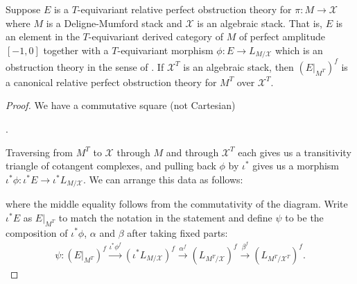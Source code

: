 \begin{lemma}\label{rl-000G}\label{lem:obstruction-theory-for-the-fixed-locus}
  Suppose \(E\) is a \(T\)-equivariant relative perfect obstruction theory for \(\pi:M\to \mathcal X\) where \(M\) is a Deligne-Mumford stack and \(\mathcal X\) is an algebraic stack. That is, \(E\) is an element in the \(T\)-equivariant derived category of \(M\) of perfect amplitude \([-1,0]\) together with a \(T\)-equivariant morphism \(\phi: E\to L_{M/\mathcal X}\) which is an obstruction theory in the sense of \cite[Definition 4.4]{behrend-fantechi_IntrinsicNormalCone1997}. If \(\mathcal X^T\) is an algebraic stack, then \((E|_{M^T})^f\) is a canonical relative perfect obstruction theory for \(M^T\) over \(\mathcal X^T\).
\end{lemma}
\begin{proof}
  We have a commutative square (not Cartesian)
  \begin{center}
    .
  \end{center}
  Traversing from \(M^T\) to \(\mathcal X\) through \(M\) and through \(\mathcal X^T\) each gives us a transitivity triangle of cotangent complexes, and pulling back \(\phi\) by \(\iota^*\) gives us a morphism \(\iota^*\phi:\iota^*E\to \iota^*L_{M/\mathcal X}\). We can arrange this data as follows:
  \begin{center}
  \end{center}
  where the middle equality follows from the commutativity of the diagram. Write \(\iota^*E\) as \(E|_{M^T}\) to match the notation in the statement and define \(\psi\) to be the composition of \(\iota^*\phi\), \(\alpha\) and \(\beta\) after taking fixed parts:
  \begin{align*}
    \psi: \left(E|_{M^T}\right)^f\xrightarrow{\iota^*\phi^f} \left(\iota^*L_{M/\mathcal X}\right)^f \xrightarrow{\alpha^f} \left(L_{M^T/\mathcal X}\right)^f \xrightarrow{\beta^f} \left(L_{M^T/\mathcal X^T}\right)^f.

\end{align*}
\end{proof}
